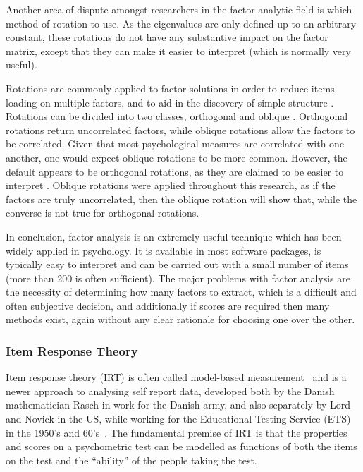 Another area of dispute amongst researchers in the factor analytic field is which method of rotation to use\cite{sass2010comparative}. As the eigenvalues are only defined up to an arbitrary constant, these rotations do not have any substantive impact on the factor matrix, except that they can make it easier to interpret (which is normally very useful). 

Rotations are commonly applied to factor solutions in order to reduce items loading on multiple factors, and to aid in the discovery of simple structure \cite{henson2006use}. Rotations can be divided into two classes, orthogonal and oblique \cite{sass2010comparative}. Orthogonal rotations return uncorrelated factors, while oblique rotations allow the factors to be correlated. Given that most psychological measures are correlated with one another, one would expect oblique rotations to be more common. However, the default appears to be orthogonal rotations, as they are claimed to be easier to interpret \cite{henson2006use}. Oblique rotations were applied throughout this research, as if the factors are truly uncorrelated, then the oblique rotation will show that, while the converse is not true for orthogonal rotations.

In conclusion, factor analysis is an extremely useful technique which has been widely applied in psychology. It is available in most software packages, is typically easy to interpret and can be carried out with a small number of items (more than 200 is often sufficient). The major problems with factor analysis are the necessity of determining how many factors to extract, which is a difficult and often subjective decision, and additionally if scores are required then many methods exist, again without any clear rationale for choosing one over the other.  

\subsubsection{Item Response Theory}
\label{sec:item-response-theory}
Item response theory (IRT) is often called model-based measurement~\cite{fischer1995rasch} and is a newer approach to analysing self report data, developed both by the Danish mathematician Rasch in work for the Danish army, and also separately by Lord and Novick in the US, while working for the Educational Testing Service (ETS) in the 1950's and 60's~\cite{van1997handbook}.
The fundamental premise of IRT is that the properties and scores on a psychometric test can be modelled as functions of both the items on the test and the ``ability'' of the people taking the test.

